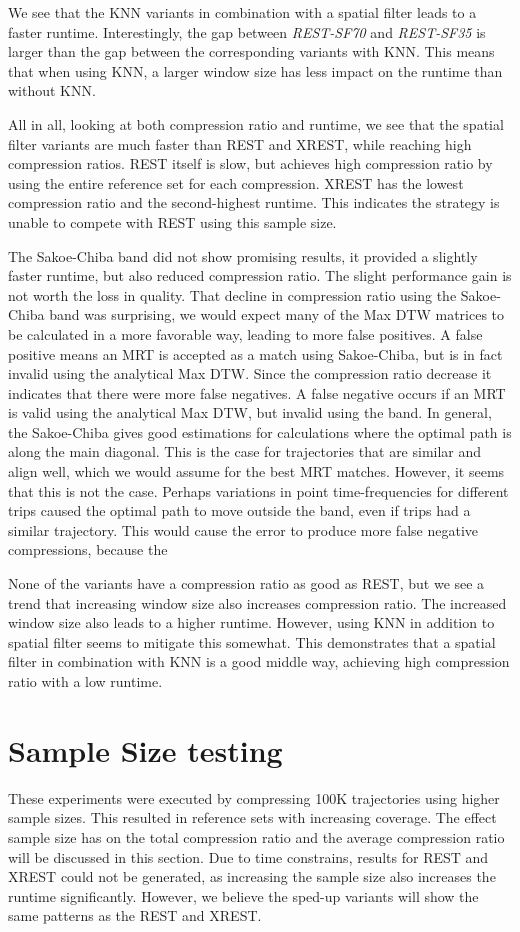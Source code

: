 We see that the KNN variants in combination with a spatial filter leads to a faster runtime. Interestingly, the gap between \textit{REST-SF70} and \textit{REST-SF35} is larger than the gap between the corresponding variants with KNN. This means that when using KNN, a larger window size has less impact on the runtime than without KNN.

All in all, looking at both compression ratio and runtime, we see that the spatial filter variants are much faster than REST and XREST, while reaching high compression ratios. REST itself is slow, but achieves high compression ratio by using the entire reference set for each compression. XREST has the lowest compression ratio and the second-highest runtime. This indicates the strategy is unable to compete with REST using this sample size.

The Sakoe-Chiba band did not show promising results, it provided a slightly faster runtime, but also reduced compression ratio. The slight performance gain is not worth the loss in quality. That decline in compression ratio using the Sakoe-Chiba band was surprising, we would expect many of the Max DTW matrices to be calculated in a more favorable way, leading to more false positives. A false positive means an MRT is accepted as a match using Sakoe-Chiba, but is in fact invalid using the analytical Max DTW. Since the compression ratio decrease it indicates that there were more false negatives. A false negative occurs if an MRT is valid using the analytical Max DTW, but invalid using the band. In general, the Sakoe-Chiba gives good estimations for calculations where the optimal path is along the main diagonal. This is the case for trajectories that are similar and align well, which we would assume for the best MRT matches. However, it seems that this is not the case. Perhaps variations in point time-frequencies for different trips caused the optimal path to move outside the band, even if trips had a similar trajectory. This would cause the error to produce more false negative compressions, because the

None of the variants have a compression ratio as good as REST, but we see a trend that increasing window size also increases compression ratio. The increased window size also leads to a higher runtime. However, using KNN in addition to spatial filter seems to mitigate this somewhat. This demonstrates that a spatial filter in combination with KNN is a good middle way, achieving high compression ratio with a low runtime.

\section{Sample Size testing}\label{sec:sample_size}
These experiments were executed by compressing 100K trajectories using higher sample sizes. This resulted in reference sets with increasing coverage. The effect sample size has on the total compression ratio and the average compression ratio will be discussed in this section. Due to time constrains, results for REST and XREST could not be generated, as increasing the sample size also increases the runtime significantly. However, we believe the sped-up variants will show the same patterns as the REST and XREST.

